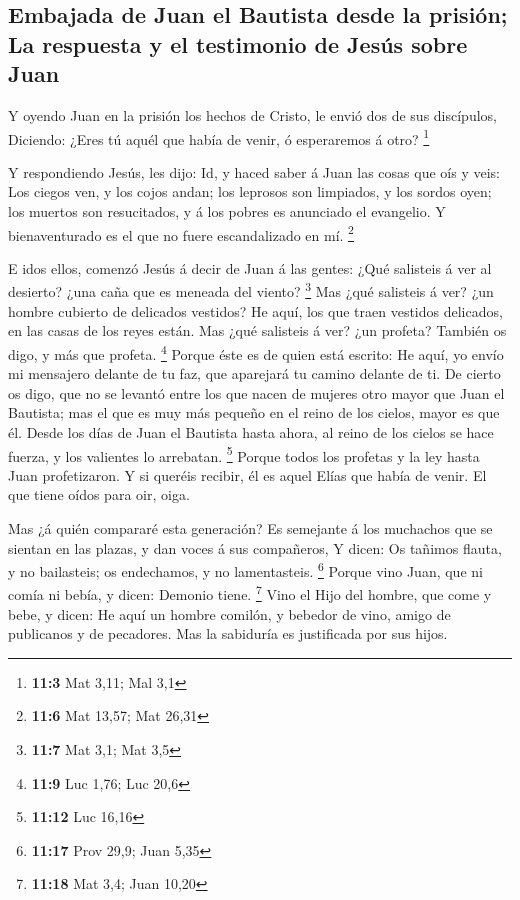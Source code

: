\hypertarget{embajada-de-juan-el-bautista-desde-la-prisiuxf3n-la-respuesta-y-el-testimonio-de-jesuxfas-sobre-juan}{%
\subsection{Embajada de Juan el Bautista desde la prisión; La respuesta
y el testimonio de Jesús sobre
Juan}\label{embajada-de-juan-el-bautista-desde-la-prisiuxf3n-la-respuesta-y-el-testimonio-de-jesuxfas-sobre-juan}}

 Y oyendo Juan en la prisión los hechos de Cristo, le
envió dos de sus discípulos,  Diciendo: ¿Eres tú aquél que
había de venir, ó esperaremos á otro? \footnote{\textbf{11:3} Mat 3,11;
  Mal 3,1}

 Y respondiendo Jesús, les dijo: Id, y haced saber á Juan
las cosas que oís y veis:  Los ciegos ven, y los cojos
andan; los leprosos son limpiados, y los sordos oyen; los muertos son
resucitados, y á los pobres es anunciado el evangelio.  Y
bienaventurado es el que no fuere escandalizado en mí. \footnote{\textbf{11:6}
  Mat 13,57; Mat 26,31}

 E idos ellos, comenzó Jesús á decir de Juan á las gentes:
¿Qué salisteis á ver al desierto? ¿una caña que es meneada del viento?
\footnote{\textbf{11:7} Mat 3,1; Mat 3,5}  Mas ¿qué
salisteis á ver? ¿un hombre cubierto de delicados vestidos? He aquí, los
que traen vestidos delicados, en las casas de los reyes están.
 Mas ¿qué salisteis á ver? ¿un profeta? También os digo, y
más que profeta. \footnote{\textbf{11:9} Luc 1,76; Luc 20,6}
 Porque éste es de quien está escrito: He aquí, yo envío
mi mensajero delante de tu faz, que aparejará tu camino delante de ti.
 De cierto os digo, que no se levantó entre los que nacen
de mujeres otro mayor que Juan el Bautista; mas el que es muy más
pequeño en el reino de los cielos, mayor es que él. 
Desde los días de Juan el Bautista hasta ahora, al reino de los cielos
se hace fuerza, y los valientes lo arrebatan. \footnote{\textbf{11:12}
  Luc 16,16}  Porque todos los profetas y la ley hasta
Juan profetizaron.  Y si queréis recibir, él es aquel
Elías que había de venir.  El que tiene oídos para oir,
oiga.

 Mas ¿á quién compararé esta generación? Es semejante á
los muchachos que se sientan en las plazas, y dan voces á sus
compañeros,  Y dicen: Os tañimos flauta, y no bailasteis;
os endechamos, y no lamentasteis. \footnote{\textbf{11:17} Prov 29,9;
  Juan 5,35}  Porque vino Juan, que ni comía ni bebía, y
dicen: Demonio tiene. \footnote{\textbf{11:18} Mat 3,4; Juan 10,20}
 Vino el Hijo del hombre, que come y bebe, y dicen: He
aquí un hombre comilón, y bebedor de vino, amigo de publicanos y de
pecadores. Mas la sabiduría es justificada por sus hijos.

